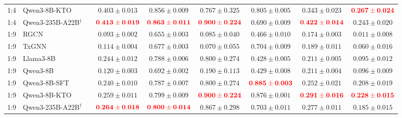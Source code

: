 \documentclass[pdflatex,sn-mathphys-num]{sn-jnl}
\begin{document}
\begin{landscape}
\begin{longtable}{clccccccc}
1:4 & Qwen3-8B-KTO &  & \(\mathbf{0.403 \pm 0.013}\) & \(\mathbf{0.856 \pm 0.009}\) & \(0.767 \pm 0.325\) & \(\mathbf{0.805 \pm 0.005}\) & \(0.343 \pm 0.023\) & \(\textcolor{red}{\mathbf{0.267 \pm 0.024}}\) \\
1:4 & Qwen3-235B-A22B$^{\dagger}$ &  & \(\textcolor{red}{\mathbf{0.413 \pm 0.019}}\) & \(\textcolor{red}{\mathbf{0.863 \pm 0.011}}\) & \(\textcolor{red}{\mathbf{0.900 \pm 0.224}}\) & \(0.690 \pm 0.009\) & \(\textcolor{red}{\mathbf{0.422 \pm 0.014}}\) & \(\mathbf{0.243 \pm 0.020}\) \\
\midrule
1:9 & RGCN &  & \(0.093 \pm 0.002\) & \(0.655 \pm 0.003\) & \(0.085 \pm 0.040\) & \(0.466 \pm 0.010\) & \(0.174 \pm 0.003\) & \(0.011 \pm 0.008\) \\
1:9 & TxGNN &  & \(0.114 \pm 0.004\) & \(0.677 \pm 0.003\) & \(0.070 \pm 0.055\) & \(0.704 \pm 0.009\) & \(0.189 \pm 0.011\) & \(0.060 \pm 0.016\) \\
1:9 & Llama3-8B &  & \(0.244 \pm 0.012\) & \(0.788 \pm 0.006\) & \(0.800 \pm 0.274\) & \(0.428 \pm 0.005\) & \(0.211 \pm 0.005\) & \(0.095 \pm 0.012\) \\
1:9 & Qwen3-8B &  & \(0.120 \pm 0.003\) & \(0.692 \pm 0.002\) & \(0.190 \pm 0.113\) & \(0.429 \pm 0.008\) & \(0.211 \pm 0.004\) & \(0.096 \pm 0.009\) \\
1:9 & Qwen3-8B-SFT &  & \(0.240 \pm 0.010\) & \(0.787 \pm 0.007\) & \(0.800 \pm 0.274\) & \(\textcolor{red}{\mathbf{0.885 \pm 0.003}}\) & \(0.252 \pm 0.021\) & \(\mathbf{0.208 \pm 0.019}\) \\
1:9 & Qwen3-8B-KTO &  & \(\mathbf{0.259 \pm 0.011}\) & \(\mathbf{0.799 \pm 0.009}\) & \(\textcolor{red}{\mathbf{0.900 \pm 0.224}}\) & \(\mathbf{0.876 \pm 0.001}\) & \(\textcolor{red}{\mathbf{0.291 \pm 0.016}}\) & \(\textcolor{red}{\mathbf{0.228 \pm 0.015}}\) \\
1:9 & Qwen3-235B-A22B$^{\dagger}$ &  & \(\textcolor{red}{\mathbf{0.264 \pm 0.018}}\) & \(\textcolor{red}{\mathbf{0.800 \pm 0.014}}\) & \(\mathbf{0.867 \pm 0.298}\) & \(0.703 \pm 0.011\) & \(\mathbf{0.277 \pm 0.011}\) & \(0.185 \pm 0.015\) \\
\end{longtable}
\end{landscape}
\end{document}
